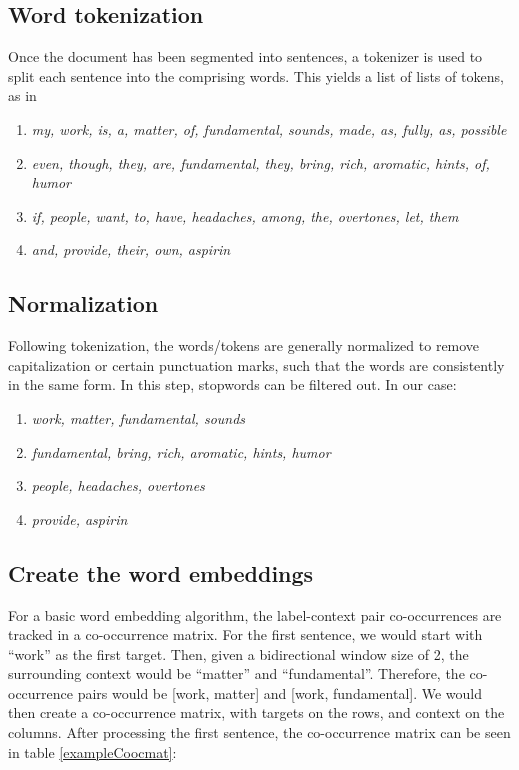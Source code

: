 \subsection{Word tokenization} 

Once the document has been segmented into sentences, a tokenizer is used to split each sentence into the comprising words. This yields a list of lists of tokens, as in
\begin{enumerate}
    \item \textit{my, work, is, a, matter, of, fundamental, sounds, made, as, fully, as, possible}
    \item \textit{even, though, they, are, fundamental, they, bring, rich, aromatic, hints, of, humor}
    \item \textit{if, people, want, to, have, headaches, among, the, overtones, let, them}
    \item \textit{and, provide, their, own, aspirin}
\end{enumerate}

\subsection{Normalization}

Following tokenization, the words/tokens are generally normalized to remove capitalization or certain punctuation marks, such that the words are consistently in the same form. In this step, stopwords can be filtered out. In our case:
\begin{enumerate}
    \item \textit{work, matter, fundamental, sounds}
    \item \textit{fundamental, bring, rich, aromatic, hints, humor}
    \item \textit{people, headaches, overtones}
    \item \textit{provide, aspirin}
\end{enumerate}

\subsection{Create the word embeddings}

For a  basic word embedding algorithm, the label-context pair co-occurrences are tracked in a co-occurrence matrix. For the first sentence, we would start with ``work'' as the first target. Then, given a bidirectional window size of 2, the surrounding context would be ``matter'' and ``fundamental''. Therefore, the co-occurrence pairs would be [work, matter] and [work, fundamental]. We would then create a co-occurrence matrix, with targets on the rows, and context on the columns.  After processing the first sentence, the co-occurrence matrix can be seen in table \ref{exampleCoocmat}:

